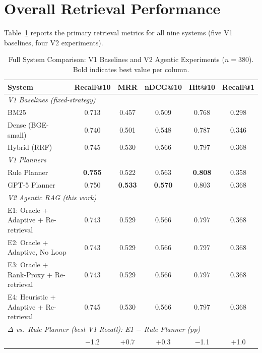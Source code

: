 \section{Overall Retrieval Performance}
\label{sec:v2_overall}

Table~\ref{tab:v2_full_comparison} reports the primary retrieval metrics for all nine systems (five V1 baselines, four V2 experiments).

\begin{table}[htbp]
\centering
\caption{Full System Comparison: V1 Baselines and V2 Agentic Experiments ($n{=}380$). Bold indicates best value per column.}
\label{tab:v2_full_comparison}
\begin{tabular}{lccccc}
\toprule
\textbf{System} & \textbf{Recall@10} & \textbf{MRR} & \textbf{nDCG@10} & \textbf{Hit@10} & \textbf{Recall@1} \\
\midrule
\multicolumn{6}{l}{\textit{V1 Baselines (fixed-strategy)}} \\
BM25                       & 0.713 & 0.457 & 0.509 & 0.768 & 0.298 \\
Dense (BGE-small)          & 0.740 & 0.501 & 0.548 & 0.787 & 0.346 \\
Hybrid (RRF)               & 0.745 & 0.530 & 0.566 & 0.797 & 0.368 \\
\midrule
\multicolumn{6}{l}{\textit{V1 Planners}} \\
Rule Planner               & \textbf{0.755} & 0.522 & 0.563 & \textbf{0.808} & 0.358 \\
GPT-5 Planner              & 0.750 & \textbf{0.533} & \textbf{0.570} & 0.803 & 0.368 \\
\midrule
\multicolumn{6}{l}{\textit{V2 Agentic RAG (this work)}} \\
E1: Oracle + Adaptive + Re-retrieval   & 0.743 & 0.529 & 0.566 & 0.797 & 0.368 \\
E2: Oracle + Adaptive, No Loop         & 0.743 & 0.529 & 0.566 & 0.797 & 0.368 \\
E3: Oracle + Rank-Proxy + Re-retrieval & 0.743 & 0.529 & 0.566 & 0.797 & 0.368 \\
E4: Heuristic + Adaptive + Re-retrieval & 0.745 & 0.530 & 0.566 & 0.797 & 0.368 \\
\midrule
\multicolumn{6}{l}{\textit{$\Delta$ vs.\ Rule Planner (best V1 Recall): E1 $-$ Rule Planner (pp)}} \\
\quad & $-$1.2 & $+$0.7 & $+$0.3 & $-$1.1 & $+$1.0 \\
\bottomrule
\end{tabular}
\end{table}

